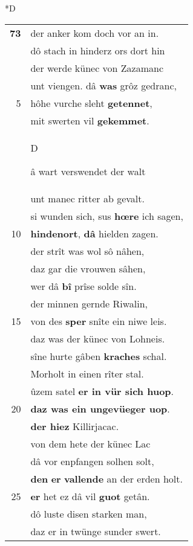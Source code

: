 \documentclass[8pt,a4paper,notitlepage]{article}
\begin{document}
\begin{table}[ht]
\begin{minipage}[t]{0.5\linewidth}
\small
\begin{center}*D
\end{center}
\begin{tabular}{rl}
\textbf{73} & der anker kom doch vor an in.\\ 
 & dô stach in hinderz ors dort hin\\ 
 & der werde künec von Zazamanc\\ 
 & unt viengen. dâ \textbf{was} grôz gedranc,\\ 
5 & hôhe vurche sleht \textbf{getennet},\\ 
 & mit swerten vil \textbf{gekemmet}.\\ 
 & \begin{large}D\end{large}â wart verswendet der walt\\ 
 & unt manec ritter ab gevalt.\\ 
 & si wunden sich, sus \textbf{hœre} ich sagen,\\ 
10 & \textbf{hindenort}, \textbf{dâ} hielden zagen.\\ 
 & der strît was wol sô nâhen,\\ 
 & daz gar die vrouwen sâhen,\\ 
 & wer dâ \textbf{bî} prîse solde sîn.\\ 
 & der minnen gernde Riwalin,\\ 
15 & von des \textbf{sper} snîte ein niwe leis.\\ 
 & daz was der künec von Lohneis.\\ 
 & sîne hurte gâben \textbf{kraches} schal.\\ 
 & Morholt in einen rîter stal.\\ 
 & ûzem satel \textbf{er in vür sich huop}.\\ 
20 & \textbf{daz was ein ungevüeger uop}.\\ 
 & \textbf{der hiez} Killirjacac.\\ 
 & von dem hete der künec Lac\\ 
 & dâ vor enpfangen solhen solt,\\ 
 & \textbf{den} \textbf{er} \textbf{vallende} an der erden holt.\\ 
25 & \textbf{er} het ez dâ vil \textbf{guot} getân.\\ 
 & dô luste disen starken man,\\ 
 & daz er in twünge sunder swert.\\ 

\end{tabular}
\end{minipage}
\end{table}
\end{document}
